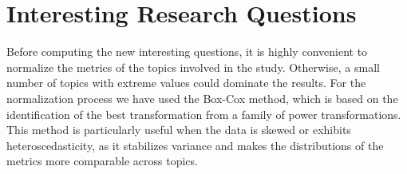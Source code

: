 







%
%
\section{Interesting Research Questions}
\label{sec:intro_interesting_questions}

Before computing the new interesting questions, it is highly convenient to normalize the metrics of the topics involved in the study. Otherwise, a small number of topics with extreme values could dominate the results. For the normalization process we have used the Box-Cox method, which is based on the identification of the best transformation from a family of power transformations. This method is particularly useful when the data is skewed or exhibits heteroscedasticity, as it stabilizes variance and makes the distributions of the metrics more comparable across topics.

